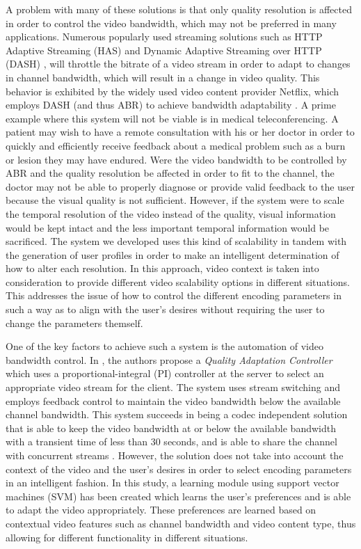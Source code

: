 \documentclass[3p,times,procedia]{elsarticle}
\begin{document}
A problem with many of these solutions is that only quality resolution is affected in order to control the video bandwidth, which may not be preferred in many applications. Numerous popularly used streaming solutions such as HTTP Adaptive Streaming (HAS) \cite{HASQoE} and Dynamic Adaptive Streaming over HTTP (DASH) \cite{DASH},  will throttle the bitrate of a video stream in order to adapt to changes in channel bandwidth, which will result in a change in video quality. This behavior is exhibited by the widely used video content provider Netflix, which employs DASH (and thus ABR) to achieve bandwidth adaptability \cite{Netflix}. A prime example where this system will not be viable is in medical teleconferencing. A patient may wish to have a remote consultation with his or her doctor in order to quickly and efficiently receive feedback about a medical problem such as a burn or lesion they may have endured. Were the video bandwidth to be controlled by ABR and the quality resolution be affected in order to fit to the channel, the doctor may not be able to properly diagnose or provide valid feedback to the user because the visual quality is not sufficient. However, if the system were to scale the temporal resolution of the video instead of the quality, visual information would be kept intact and the less important temporal information would be sacrificed. The system we developed uses this kind of scalability in tandem with the generation of user profiles in order to make an intelligent determination of how to alter each resolution. In this approach, video context is taken into consideration to provide different video scalability options in different situations. This addresses the issue of how to control the different encoding parameters in such a way as to align with the user’s desires without requiring the user to change the parameters themself.

One of the key factors to achieve such a system is the automation of video bandwidth control. In \cite{FeedbackControl}, the authors propose a \emph{Quality Adaptation Controller} which uses a proportional-integral (PI) controller at the server to select an appropriate video stream for the client. The system uses stream switching and employs feedback control to maintain the video bandwidth below the available channel bandwidth. This system succeeds in being a codec independent solution that is able to keep the video bandwidth at or below the available bandwidth with a transient time of less than 30 seconds, and is able to share the channel with concurrent streams \cite{FeedbackControl}. However, the solution does not take into account the context of the video and the user’s desires in order to select encoding parameters in an intelligent fashion. In this study, a learning module using support vector machines (SVM) has been created which learns the user’s preferences and is able to adapt the video appropriately. These preferences are learned based on contextual video features such as channel bandwidth and video content type, thus allowing for different functionality in different situations.
\end{document}

